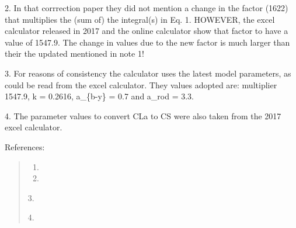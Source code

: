 \documentclass[letterpaper,10pt,english]{sphinxmanual}
\begin{document}
\begin{fulllineitems}
\begin{description}
2. In that corrrection paper they did not mention a change in the
factor (1622) that multiplies the (sum of) the integral(s) in Eq. 1. 
HOWEVER, the excel calculator released in 2017 and the online 
calculator show that factor to have a value of 1547.9. The change in
values due to the new factor is much larger than their the updated 
mentioned in note 1!

3. For reasons of consistency the calculator uses the latest model 
parameters, as could be read from the excel calculator. They values 
adopted are: multiplier 1547.9, k = 0.2616, a\_\{b-y\} = 0.7 and 
a\_rod = 3.3.

4. The parameter values to convert CLa to CS were also taken from the 
2017 excel calculator.

\end{description}

References:
\begin{quote}
\begin{enumerate}
\item {} 

\item {} 

\end{enumerate}

3. 

4. 
\end{quote}

\end{fulllineitems}
\end{document}
